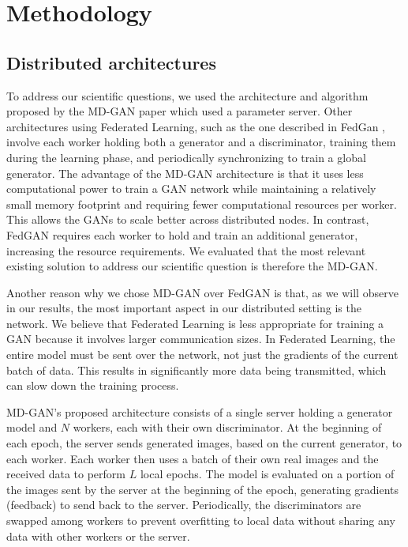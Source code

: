 \chapter{Methodology}
\label{chap:methodology}

\section{Distributed architectures}
To address our scientific questions, we used the architecture and algorithm proposed by the MD-GAN paper \cite{mdgan} which used a parameter server. Other architectures using Federated Learning, such as the one described in FedGan \cite{fedgan}, involve each worker holding both a generator and a discriminator, training them during the learning phase, and periodically synchronizing to train a global generator. The advantage of the MD-GAN architecture is that it uses less computational power to train a GAN network while maintaining a relatively small memory footprint and requiring fewer computational resources per worker. This allows the GANs to scale better across distributed nodes. In contrast, FedGAN requires each worker to hold and train an additional generator, increasing the resource requirements. We evaluated that the most relevant existing solution to address our scientific question is therefore the MD-GAN.

Another reason why we chose MD-GAN over FedGAN is that, as we will observe in our results, the most important aspect in our distributed setting is the network. We believe that Federated Learning is less appropriate for training a GAN because it involves larger communication sizes. In Federated Learning, the entire model must be sent over the network, not just the gradients of the current batch of data. This results in significantly more data being transmitted, which can slow down the training process.

MD-GAN's proposed architecture consists of a single server holding a generator model and $N$ workers, each with their own discriminator. At the beginning of each epoch, the server sends generated images, based on the current generator, to each worker. Each worker then uses a batch of their own real images and the received data to perform $L$ local epochs. The model is evaluated on a portion of the images sent by the server at the beginning of the epoch, generating gradients (feedback) to send back to the server. Periodically, the discriminators are swapped among workers to prevent overfitting to local data without sharing any data with other workers or the server.

